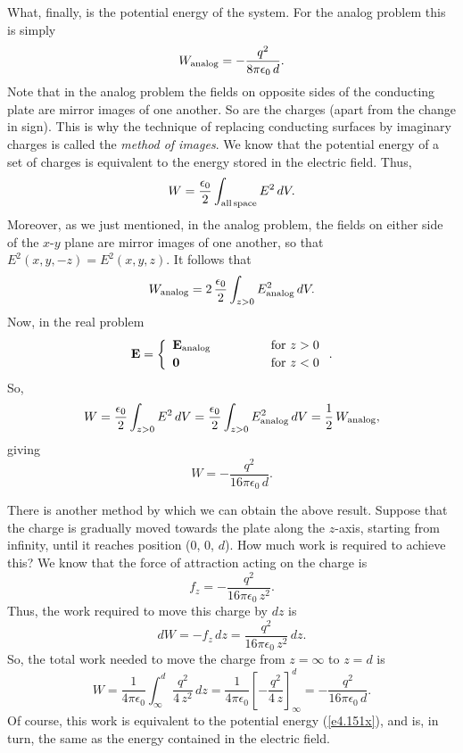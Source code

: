 What, finally, is the potential energy of the system. For the analog problem
this is simply
\begin{equation}
W_{\rm analog} = -  \frac{q^2}{8\pi\epsilon_0\,d}.
\end{equation}
Note that in the analog problem the fields on opposite sides of the conducting plate are mirror images
of one another. So are the charges (apart from the change
in sign). This is why the technique of replacing conducting surfaces by
imaginary charges is called the {\em method of images}. We know that the potential
 energy
of a set of charges is equivalent to the energy stored in the electric field.
Thus,
\begin{equation}
W = \frac{\epsilon_0}{2} \int_{\rm all\,space} E^{2}\,dV.
\end{equation}
Moreover, as we just mentioned, in the analog problem, the fields on either side of the $x$-$y$ plane are
mirror images of one another, so that $E^2(x, y, -z) = E^2(x, y, z)$. It follows
that
\begin{equation}
W_{\rm analog} = 2 \,\frac{\epsilon_0}{2} \int_{z>0} E^2_{\rm analog} \,dV.
\end{equation}
Now, in the real problem
\begin{equation}
{\bf E} =\left\{ 
\begin{array}{lcl}
{\bf E}_{\rm analog}&\mbox{\hspace{1cm}}&\mbox{for $z>0$}\\[0.5ex]
{\bf 0} &&\mbox{for $z <0$}
\end{array}
\right..
\end{equation}
So,
\begin{equation}
W = \frac{\epsilon_0}{2} \int_{z>0} E^2\,dV=
\frac{\epsilon_0}{2} \int_{z>0} E_{\rm analog}^2 \,dV = 
\frac{1}{2} \,W_{\rm analog},
\end{equation}
giving
\begin{equation}\label{e4.151x}
W = -  \frac{q^2}{16\pi\epsilon_0\,d}.
\end{equation}

There is another method by which we can obtain the above result. Suppose that
the charge is gradually moved towards the plate along the $z$-axis, starting from infinity,
until it reaches position (0, 0, $d$). How much work is required to
achieve this? We know that the force of attraction acting on  the charge is
\begin{equation}
f_z = - \frac{q^2}{16\pi\epsilon_0 \,z^2}.
\end{equation}
Thus, the work required to move this charge by $dz$ is
\begin{equation}
d W = - f_z\,dz=\frac{q^2}{16\pi\epsilon_0\,z^2}\,dz.
\end{equation}
So, the total work needed to move the charge from $z=\infty$ to $z= d$ is
\begin{equation}
W = \frac{1}{4\pi\epsilon_0}\int_{\infty}^d \frac{q^2}{4\,z^2}\,dz
= \frac{1}{4\pi\epsilon_0} \left[ - \frac{q^2}{4 \,z} \right]_{\infty}^d
= -  \frac{q^2}{16\pi\epsilon_0\,d}.
\end{equation}
Of course, this work is equivalent to the potential energy (\ref{e4.151x}),
and is, in turn, the same as the energy contained in the electric field.


